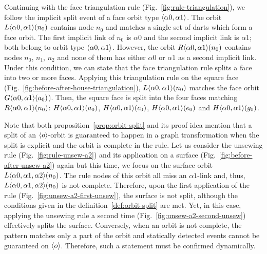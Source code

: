 Continuing with the face triangulation rule (Fig.~\ref{fig:rule-triangulation}), we follow the implicit split event of a face orbit type $\langle\alpha 0, \alpha 1\rangle$.
The orbit $L\langle\alpha 0, \alpha 1\rangle(n_{0})$ contains node $n_{0}$ and matches a single set of darts which form a face orbit.
The first implicit link of $n_{0}$ is $\alpha 0$ and the second implicit
link is $\alpha 1$; both belong to orbit type $\langle\alpha 0, \alpha 1\rangle$.
However, the orbit $R\langle\alpha 0, \alpha 1\rangle(n_{0})$ contains nodes $n_{0}$, $n_{1}$, $n_{2}$ and none of them has either $\alpha 0$ or $\alpha 1$ as a second implicit link. %
Under this condition, we can state that the face triangulation rule splits a face into two or more faces.
Applying this triangulation rule on the square face (Fig.~\ref{fig:before-after-house-triangulation}), $L\langle\alpha 0, \alpha 1\rangle(n_{0})$ matches the face orbit $G\langle\alpha 0, \alpha 1\rangle(a_{0})$).
Then, the square face is split into the four faces matching $R\langle\alpha 0, \alpha 1\rangle(n_{0})$:  $H\langle\alpha 0, \alpha 1\rangle(a_{0})$, $H\langle\alpha 0, \alpha 1\rangle(c_{0})$, $H\langle\alpha 0, \alpha 1\rangle(e_{0})$ and $H\langle\alpha 0, \alpha 1\rangle(g_{0})$.

Note that both proposition~\ref{prop:orbit-split} and its proof idea mention that a split of an $\langle o\rangle$-orbit is guaranteed to happen in a graph transformation when the split is explicit and the orbit is complete in the rule.
Let us consider the unsewing rule (Fig.~\ref{fig:rule-unsew-a2}) and its application on a surface (Fig.~\ref{fig:before-after-unsew-a2}) again but this time, we focus on the surface orbit $L\langle\alpha 0, \alpha 1, \alpha 2\rangle(n_{0})$.
The rule nodes of this orbit all miss an $\alpha 1$-link and, thus, $L\langle\alpha 0, \alpha 1, \alpha 2\rangle(n_{0})$ is not complete.%
Therefore, upon the first application of the rule (Fig.~\ref{fig:unsew-a2-first-unsew}), the surface is not split, although the conditions given in the definition~\ref{def:orbit-split} are met.
Yet, in this case, applying the unsewing rule a second time (Fig.~\ref{fig:unsew-a2-second-unsew}) effectively splits the surface.
Conversely, when an orbit is not complete, the pattern matches only a part of the orbit and statically detected events cannot be guaranteed on $\langle o\rangle$.
Therefore, such a statement must be confirmed dynamically.

